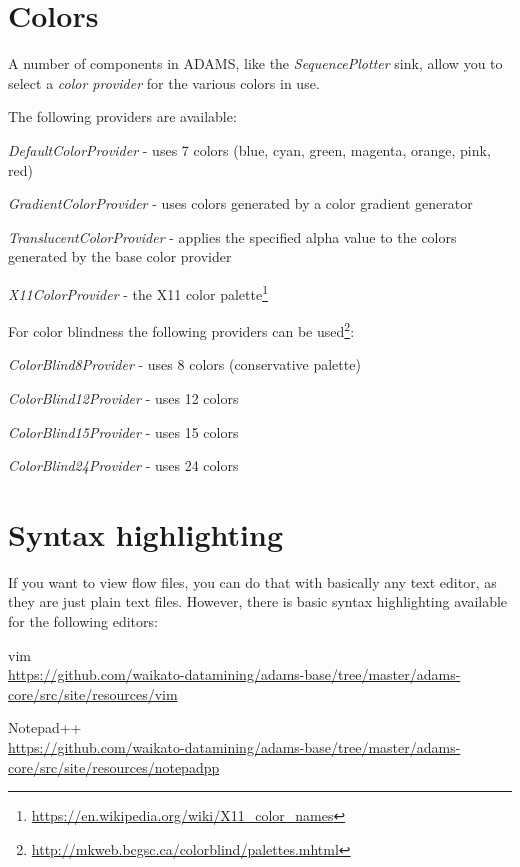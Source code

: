 \clearpage
\section{Colors}
A number of components in ADAMS, like the \textit{SequencePlotter} sink, allow
you to select a \textit{color provider} for the various colors in use.

\noindent The following providers are available:
\begin{tight_itemize}
  \item \textit{DefaultColorProvider} - uses 7 colors (blue, cyan, green, magenta, orange, pink, red)
  \item \textit{GradientColorProvider} - uses colors generated by a color gradient generator
  \item \textit{TranslucentColorProvider} - applies the specified alpha value to the colors generated by the base color provider
  \item \textit{X11ColorProvider} - the X11 color palette\footnote{\url{https://en.wikipedia.org/wiki/X11_color_names}{}}
\end{tight_itemize}

\noindent For color blindness the following providers can be used\footnote{\url{http://mkweb.bcgsc.ca/colorblind/palettes.mhtml}{}}:
\begin{tight_itemize}
  \item \textit{ColorBlind8Provider} - uses 8 colors (conservative palette)
  \item \textit{ColorBlind12Provider} - uses 12 colors
  \item \textit{ColorBlind15Provider} - uses 15 colors
  \item \textit{ColorBlind24Provider} - uses 24 colors
\end{tight_itemize}


\clearpage
\section{Syntax highlighting}
If you want to view flow files, you can do that with basically any text editor, as they are just
plain text files. However, there is basic syntax highlighting available for the following editors:
\begin{tight_itemize}
    \item vim \\
    \url{https://github.com/waikato-datamining/adams-base/tree/master/adams-core/src/site/resources/vim}{}
    \item Notepad++ \\
    \url{https://github.com/waikato-datamining/adams-base/tree/master/adams-core/src/site/resources/notepadpp}{}
\end{tight_itemize}



